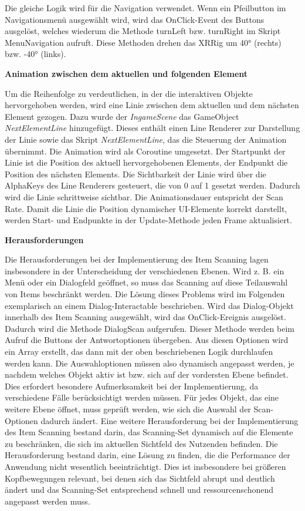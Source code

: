 Die gleiche Logik wird für die Navigation verwendet. Wenn ein Pfeilbutton im Navigationsmenü ausgewählt wird, wird das OnClick-Event des Buttons ausgelöst, welches wiederum die Methode turnLeft bzw. turnRight im Skript MenuNavigation aufruft. Diese Methoden drehen das XRRig um 40° (rechts) bzw. -40° (links).

\textbf{Animation zwischen dem aktuellen und folgenden Element}

Um die Reihenfolge zu verdeutlichen, in der die interaktiven Objekte hervorgehoben werden, wird eine Linie zwischen dem aktuellen und dem nächsten Element gezogen. Dazu wurde der \textit{IngameScene} das GameObject \textit{NextElementLine} hinzugefügt. Dieses enthält einen Line Renderer zur Darstellung der Linie sowie das Skript \textit{NextElementLine}, das die Steuerung der Animation übernimmt.
Die Animation wird als Coroutine umgesetzt. Der Startpunkt der Linie ist die Position des aktuell hervorgehobenen Elements, der Endpunkt die Position des nächsten Elements. Die Sichtbarkeit der Linie wird über die AlphaKeys des Line Renderers gesteuert, die von 0 auf 1 gesetzt werden. Dadurch wird die Linie schrittweise sichtbar. Die Animationsdauer entspricht der Scan Rate. Damit die Linie die Position dynamischer UI-Elemente korrekt darstellt, werden Start- und Endpunkte in der Update-Methode jeden Frame aktualisiert.

\textbf{Herausforderungen}

Die Herausforderungen bei der Implementierung des Item Scanning lagen insbesondere in der Unterscheidung der verschiedenen Ebenen. Wird z. B.  ein Menü oder ein Dialogfeld geöffnet, so muss das Scanning auf diese Teilauswahl von Items beschränkt werden. Die Lösung dieses Problems wird im Folgenden exemplarisch an einem Dialog-Interactable beschrieben. 
Wird das Dialog-Objekt innerhalb des Item Scanning ausgewählt, wird das OnClick-Ereignis ausgelöst. Dadurch wird die Methode DialogScan aufgerufen. Dieser Methode werden beim Aufruf die Buttons der Antwortoptionen übergeben. Aus diesen Optionen wird ein Array erstellt, das dann mit der oben beschriebenen Logik durchlaufen werden kann. Die Auswahloptionen müssen also dynamisch angepasst werden, je nachdem welches Objekt aktiv ist bzw. sich auf der vordersten Ebene befindet. Dies erfordert besondere Aufmerksamkeit bei der Implementierung, da verschiedene Fälle berücksichtigt werden müssen. Für jedes Objekt, das eine weitere Ebene öffnet, muss geprüft werden, wie sich die Auswahl der Scan-Optionen dadurch ändert. 
Eine weitere Herausforderung bei der Implementierung des Item Scanning bestand darin, das Scanning-Set dynamisch auf die Elemente zu beschränken, die sich im aktuellen Sichtfeld des Nutzenden befinden. Die Herausforderung bestand darin, eine Lösung zu finden, die die Performance der Anwendung nicht wesentlich beeinträchtigt. Dies ist insbesondere bei größeren Kopfbewegungen relevant, bei denen sich das Sichtfeld abrupt und deutlich ändert und das Scanning-Set entsprechend schnell und ressourcenschonend angepasst werden muss.

